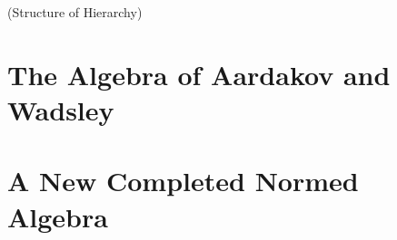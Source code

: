 \begin{proposition}(Structure of Hierarchy)
\end{proposition}

\newpage
\section{The Algebra of Aardakov and Wadsley}

\section{A New Completed Normed Algebra}
